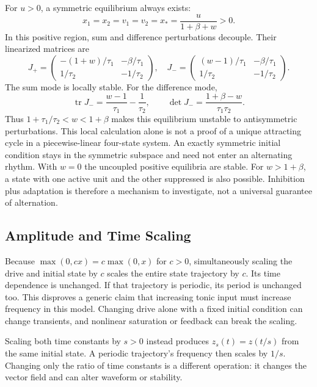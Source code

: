 For $u>0$, a symmetric equilibrium always exists:
\begin{equation}
 x_1=x_2=v_1=v_2=x_*=\frac{u}{1+\beta+w}>0.
\end{equation}
In this positive region, sum and difference perturbations decouple. Their
linearized matrices are
\begin{equation}
 J_+=\begin{pmatrix}-(1+w)/\tau_1&-\beta/\tau_1\\1/\tau_2&-1/\tau_2\end{pmatrix},
 \quad
 J_-=\begin{pmatrix}(w-1)/\tau_1&-\beta/\tau_1\\1/\tau_2&-1/\tau_2\end{pmatrix}.
\end{equation}
The sum mode is locally stable. For the difference mode,
\begin{equation}
 \operatorname{tr}J_-=\frac{w-1}{\tau_1}-\frac{1}{\tau_2},\qquad
 \det J_-=\frac{1+\beta-w}{\tau_1\tau_2}.
\end{equation}
Thus $1+\tau_1/\tau_2<w<1+\beta$ makes this equilibrium unstable to
antisymmetric perturbations. This local calculation alone is not a proof of a
unique attracting cycle in a piecewise-linear four-state system. An exactly
symmetric initial condition stays in the symmetric subspace and need not enter
an alternating rhythm. With $w=0$ the uncoupled positive equilibria are stable.
For $w>1+\beta$, a state with one active unit and the other suppressed is also
possible. Inhibition plus adaptation is therefore a mechanism to investigate,
not a universal guarantee of alternation.

\subsection{Amplitude and Time Scaling}

Because $\max(0,cx)=c\max(0,x)$ for $c>0$, simultaneously scaling the drive and
initial state by $c$ scales the entire state trajectory by $c$. Its time
dependence is unchanged. If that trajectory is periodic, its period is unchanged
too. This disproves a generic claim that increasing tonic input must increase
frequency in this model. Changing drive alone with a fixed initial condition
can change transients, and nonlinear saturation or feedback can break the scaling.

Scaling both time constants by $s>0$ instead produces
$z_s(t)=z(t/s)$ from the same initial state. A periodic trajectory's frequency
then scales by $1/s$. Changing only the ratio of time constants is a different
operation: it changes the vector field and can alter waveform or stability.

